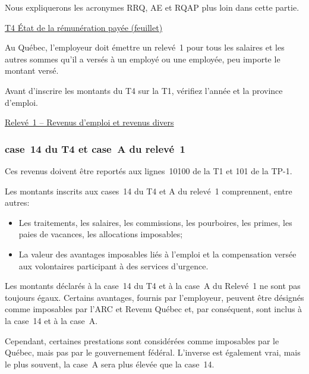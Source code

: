 \begin{note}
	Nous expliquerons les acronymes RRQ, AE et RQAP plus loin dans cette partie.
\end{note}
\cat\href{https://www.canada.ca/fr/agence-revenu/services/formulaires-publications/formulaires/t4.html}{T4 État de la rémunération payée (feuillet)}

\qc
Au Québec, l'employeur doit émettre un relevé~1 pour tous les salaires et les autres sommes qu'il a versés à un employé ou une employée, peu importe le montant versé.

\begin{note}
	Avant d'inscrire les montants du T4 sur la T1, vérifiez l'année et la province d'emploi.
\end{note}
\qct\href{https://www.revenuquebec.ca/fr/services-en-ligne/formulaires-et-publications/details-courant/rl-1/}{Relevé~1 – Revenus d'emploi et revenus divers }


\subsubsection{case~14 du T4 et case~A du relevé~1}
Ces revenus doivent être reportés aux lignes~10100 de la T1 et 101 de la TP-1.

Les montants inscrits aux cases~14 du T4 et A du relevé~1 comprennent, entre
autres:
\begin{itemize}
	\item Les traitements, les salaires, les commissions, les pourboires, les primes, les paies de vacances, les allocations imposables;
	\item La valeur des avantages imposables liés à l'emploi et la compensation versée aux volontaires participant à des services d'urgence.
\end{itemize}

\begin{note}
	Les montants déclarés à la case~14 du T4 et à la case~A du Relevé~1 ne sont pas toujours égaux. Certains avantages, fournis par l'employeur, peuvent être désignés comme imposables par l'ARC et Revenu Québec et, par conséquent, sont inclus à la case~14 et à la case~A.
	
	Cependant, certaines prestations sont considérées comme imposables par le Québec, mais pas par le gouvernement fédéral. L'inverse est également vrai, mais le plus souvent, la case~A sera plus élevée que la case~14.
\end{note}

